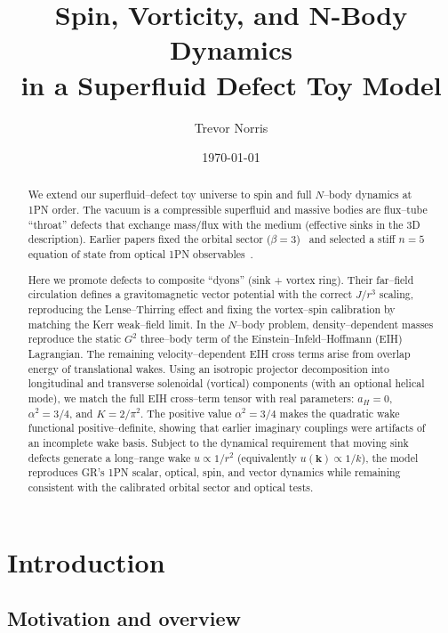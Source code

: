 \documentclass[11pt]{article}
\title{Spin, Vorticity, and N-Body Dynamics\\
in a Superfluid Defect Toy Model}
\author{Trevor Norris}
\date{\today}
\begin{document}
\maketitle

\begin{abstract}
We extend our superfluid--defect toy universe to spin and full $N$--body dynamics at 1PN order.
The vacuum is a compressible superfluid and massive bodies are flux--tube ``throat'' defects that exchange mass/flux with the medium (effective sinks in the 3D description).
Earlier papers fixed the orbital sector ($\beta=3$)~\cite{Norris:2025Orbits} and selected a stiff $n=5$ equation of state from optical 1PN observables~\cite{Norris:Paper2}.

Here we promote defects to composite ``dyons'' (sink + vortex ring).
Their far--field circulation defines a gravitomagnetic vector potential with the correct $J/r^3$ scaling, reproducing the Lense--Thirring effect and fixing the vortex--spin calibration by matching the Kerr weak--field limit.
In the $N$--body problem, density--dependent masses reproduce the static $G^2$ three--body term of the Einstein--Infeld--Hoffmann (EIH) Lagrangian.
The remaining velocity--dependent EIH cross terms arise from overlap energy of translational wakes.
Using an isotropic projector decomposition into longitudinal and transverse solenoidal (vortical) components (with an optional helical mode), we match the full EIH cross--term tensor with real parameters: $a_H=0$, $\alpha^2=3/4$, and $K=2/\pi^2$.
The positive value $\alpha^2=3/4$ makes the quadratic wake functional positive--definite, showing that earlier imaginary couplings were artifacts of an incomplete wake basis.
Subject to the dynamical requirement that moving sink defects generate a long--range wake $u\propto 1/r^2$ (equivalently $u(\mathbf{k})\propto 1/k$), the model reproduces GR's 1PN scalar, optical, spin, and vector dynamics while remaining consistent with the calibrated orbital sector and optical tests.
\end{abstract}

\section{Introduction}
\label{sec:intro}

\subsection{Motivation and overview}
\label{subsec:intro-motivation}
\end{document}
